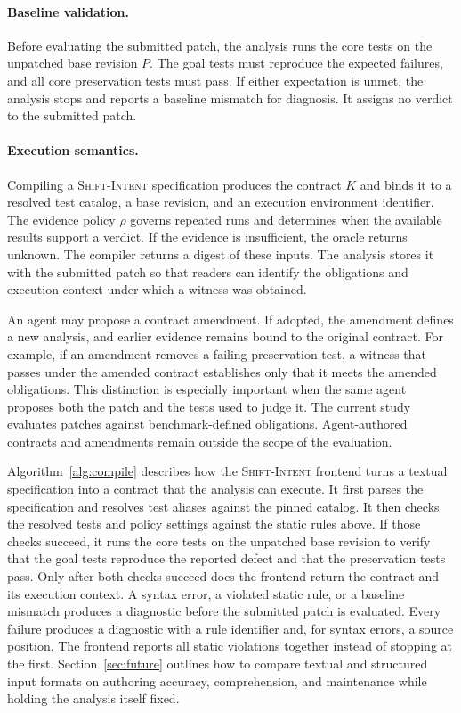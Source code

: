 \documentclass[a4paper,fleqn]{cas-sc}
\newcommand{\dsl}{\textsc{Shift-Intent}}
\newcommand{\lab}[1]{\textsf{#1}}
\begin{document}
\paragraph{Baseline validation.} Before evaluating the submitted patch, the analysis runs the core tests on the unpatched base revision $P$. The goal tests must reproduce the expected failures, and all core preservation tests must pass. If either expectation is unmet, the analysis stops and reports a baseline mismatch for diagnosis. It assigns no verdict to the submitted patch.

\paragraph{Execution semantics.} Compiling a \dsl{} specification produces the contract $K$ and binds it to a resolved test catalog, a base revision, and an execution environment identifier. The evidence policy $\rho$ governs repeated runs and determines when the available results support a verdict. If the evidence is insufficient, the oracle returns \lab{unknown}. The compiler returns a digest of these inputs. The analysis stores it with the submitted patch so that readers can identify the obligations and execution context under which a witness was obtained.

An agent may propose a contract amendment. If adopted, the amendment defines a new analysis, and earlier evidence remains bound to the original contract. For example, if an amendment removes a failing preservation test, a witness that passes under the amended contract establishes only that it meets the amended obligations. This distinction is especially important when the same agent proposes both the patch and the tests used to judge it. The current study evaluates patches against benchmark-defined obligations. Agent-authored contracts and amendments remain outside the scope of the evaluation.










Algorithm~\ref{alg:compile} describes how the \dsl{} frontend turns a textual specification into a contract that the analysis can execute. It first parses the specification and resolves test aliases against the pinned catalog. It then checks the resolved tests and policy settings against the static rules above. If those checks succeed, it runs the core tests on the unpatched base revision to verify that the goal tests reproduce the reported defect and that the preservation tests pass. Only after both checks succeed does the frontend return the contract and its execution context. A syntax error, a violated static rule, or a baseline mismatch produces a diagnostic before the submitted patch is evaluated. Every failure produces a diagnostic with a rule identifier and, for syntax errors, a source position. The frontend reports all static violations together instead of stopping at the first. Section~\ref{sec:future} outlines how to compare textual and structured input formats on authoring accuracy, comprehension, and maintenance while holding the analysis itself fixed.
\end{document}
